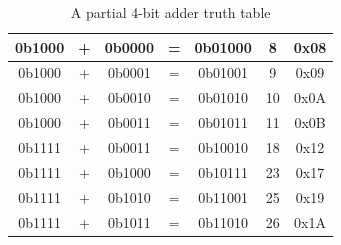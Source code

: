 \documentclass[12pt]{article}
\begin{document}
\begin{table}[h]
\begin{tabular}{ | c | c | c | c | c | c | c | }
    0b1000            & +          & 0b0000            & =          & 0b01000                                                                 & 8                                                                           & 0x08                                                                   \\ \hline
    0b1000            & +          & 0b0001            & =          & 0b01001                                                                 & 9                                                                           & 0x09                                                                   \\ \hline
    0b1000            & +          & 0b0010            & =          & 0b01010                                                                 & 10                                                                          & 0x0A                                                                   \\ \hline
    0b1000            & +          & 0b0011            & =          & 0b01011                                                                 & 11                                                                          & 0x0B                                                                   \\ \hline
    0b1111            & +          & 0b0011            & =          & 0b10010                                                                 & 18                                                                          & 0x12                                                                   \\ \hline
    0b1111            & +          & 0b1000            & =          & 0b10111                                                                 & 23                                                                          & 0x17                                                                   \\ \hline
    0b1111            & +          & 0b1010            & =          & 0b11001                                                                 & 25                                                                          & 0x19                                                                   \\ \hline
    0b1111            & +          & 0b1011            & =          & 0b11010                                                                 & 26                                                                          & 0x1A                                                                   \\ \hline
    \end{tabular}
    \caption{A partial 4-bit adder truth table}
    \label{table:2}
\end{table}
\end{document}
